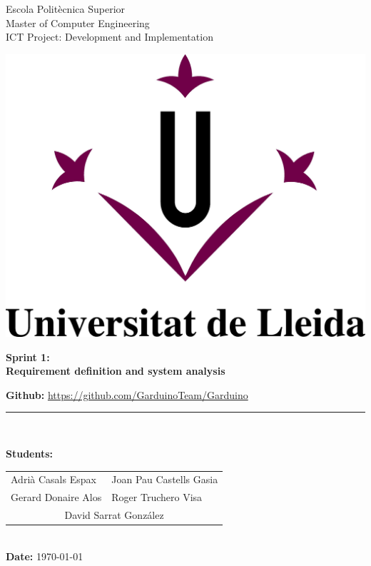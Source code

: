 \documentclass[11pt,a4paper]{article}
\begin{document}
\begin{titlepage}

\begin{flushleft}
Escola Politècnica Superior\\
\vspace*{0.15in}
Master of Computer Engineering\\
\vspace*{0.15in}
ICT Project: Development and Implementation
\end{flushleft}

\begin{center}
\vspace{2.0cm}\includegraphics[scale=0.3]{figures/M-UdL.jpg}
\vspace{5.0cm}

\begin{LARGE}
\textbf{Sprint 1:}\\ 
\vspace*{0.15in}
\textbf{Requirement definition and system analysis}
\end{LARGE}
\vspace{5.0cm}

\vspace*{0.25in}
\textbf{Github: } \url{https://github.com/GarduinoTeam/Garduino}
\rule{80mm}{0.1mm}\\
\vspace*{0.1in}

\begin{large}
\textbf{Students:}

\begin{tabular}{ll}
Adrià Casals Espax  & Joan Pau Castells Gasia \\
Gerard Donaire Alos  & Roger Truchero Visa \\
\multicolumn{2}{c}{David Sarrat González}
\end{tabular}
\\
\textbf{Date:} \today \\
\end{large}

\end{center}
\end{titlepage}
\end{document}
